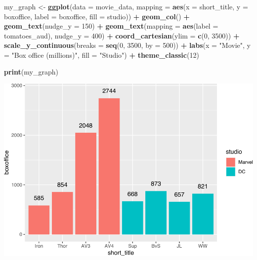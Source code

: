 \documentclass[
]{krantz}
\makeatletter
\newenvironment{Shaded}{\begin{snugshade}}{\end{snugshade}}
\newcommand{\DataTypeTok}[1]{\textcolor[rgb]{0.27,0.27,0.27}{#1}}
\newcommand{\DecValTok}[1]{\textcolor[rgb]{0.06,0.06,0.06}{#1}}
\newcommand{\KeywordTok}[1]{\textcolor[rgb]{0.27,0.27,0.27}{\textbf{#1}}}
\newcommand{\NormalTok}[1]{#1}
\newcommand{\OperatorTok}[1]{\textcolor[rgb]{0.43,0.43,0.43}{\textbf{#1}}}
\newcommand{\StringTok}[1]{\textcolor[rgb]{0.5,0.5,0.5}{#1}}
\newenvironment{kframe}{%
\medskip{}
\setlength{\fboxsep}{.8em}
 \def\at@end@of@kframe{}%
 \ifinner\ifhmode%
  \def\at@end@of@kframe{\end{minipage}}%
  \begin{minipage}{\columnwidth}%
 \fi\fi%
 \def\FrameCommand##1{\hskip\@totalleftmargin \hskip-\fboxsep
 \colorbox{shadecolor}{##1}\hskip-\fboxsep
     \hskip-\linewidth \hskip-\@totalleftmargin \hskip\columnwidth}%
 \MakeFramed {\advance\hsize-\width
   \@totalleftmargin\z@ \linewidth\hsize
   \@setminipage}}%
 {\par\unskip\endMakeFramed%
 \at@end@of@kframe}
\renewenvironment{Shaded}{\begin{kframe}}{\end{kframe}}
\makeatother
\begin{document}
\begin{Shaded}
\begin{Highlighting}[]
\NormalTok{my_graph <-}\StringTok{ }\KeywordTok{ggplot}\NormalTok{(}\DataTypeTok{data =}\NormalTok{ movie_data,}
           \DataTypeTok{mapping =} \KeywordTok{aes}\NormalTok{(}\DataTypeTok{x =}\NormalTok{ short_title,}
                         \DataTypeTok{y =}\NormalTok{ boxoffice,}
                         \DataTypeTok{label =}\NormalTok{ boxoffice, }
                         \DataTypeTok{fill =}\NormalTok{ studio)) }\OperatorTok{+}
\StringTok{  }\KeywordTok{geom_col}\NormalTok{() }\OperatorTok{+}
\StringTok{  }\KeywordTok{geom_text}\NormalTok{(}\DataTypeTok{nudge_y =} \DecValTok{150}\NormalTok{)  }\OperatorTok{+}
\StringTok{  }\KeywordTok{geom_text}\NormalTok{(}\DataTypeTok{mapping =} \KeywordTok{aes}\NormalTok{(}\DataTypeTok{label =}\NormalTok{ tomatoes_aud), }
            \DataTypeTok{nudge_y =} \DecValTok{400}\NormalTok{) }\OperatorTok{+}
\StringTok{  }\KeywordTok{coord_cartesian}\NormalTok{(}\DataTypeTok{ylim =} \KeywordTok{c}\NormalTok{(}\DecValTok{0}\NormalTok{, }\DecValTok{3500}\NormalTok{)) }\OperatorTok{+}
\StringTok{  }\KeywordTok{scale_y_continuous}\NormalTok{(}\DataTypeTok{breaks =} \KeywordTok{seq}\NormalTok{(}\DecValTok{0}\NormalTok{, }\DecValTok{3500}\NormalTok{, }\DataTypeTok{by =} \DecValTok{500}\NormalTok{)) }\OperatorTok{+}
\StringTok{  }\KeywordTok{labs}\NormalTok{(}\DataTypeTok{x =} \StringTok{"Movie"}\NormalTok{,}
       \DataTypeTok{y =} \StringTok{"Box office (millions)"}\NormalTok{,}
       \DataTypeTok{fill =} \StringTok{"Studio"}\NormalTok{) }\OperatorTok{+}
\StringTok{  }\KeywordTok{theme_classic}\NormalTok{(}\DecValTok{12}\NormalTok{)}

\KeywordTok{print}\NormalTok{(my_graph)}
\end{Highlighting}
\end{Shaded}

\includegraphics[width=0.65\linewidth]{bookdown_files/figure-latex/unnamed-chunk-265-1}
\end{document}
